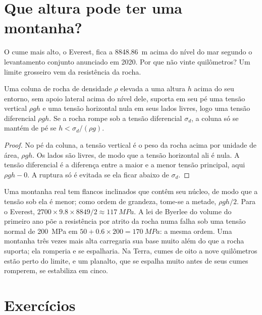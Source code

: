 \section{Que altura pode ter uma montanha?}\label{sec:b2:himalaya-andes:heights}

O cume mais alto, o Everest, fica a \qty{8848.86}{m} acima do nível do mar segundo o levantamento conjunto
anunciado em 2020. Por que não vinte quilômetros? Um limite grosseiro vem da resistência da rocha.

\begin{proposition}\label{prop:b2:himalaya-andes:height}
Uma coluna de rocha de densidade $\rho$ elevada a uma altura $h$ acima do seu entorno, sem
apoio lateral acima do nível dele, suporta em seu pé uma tensão vertical $\rho g h$ e uma
tensão horizontal nula em seus lados livres, logo uma tensão diferencial $\rho g h$. Se a
rocha rompe sob a tensão diferencial $\sigma_d$, a coluna só se mantém de pé se $h < \sigma_d/(\rho
g)$.
\end{proposition}

\begin{proof}
No pé da coluna, a tensão vertical é o peso da rocha acima por unidade de área,
$\rho g h$. Os lados são livres, de modo que a tensão horizontal ali é nula. A tensão diferencial
é a diferença entre a maior e a menor tensão principal, aqui $\rho g h - 0$.
A ruptura só é evitada se ela ficar abaixo de $\sigma_d$.
\end{proof}

Uma montanha real tem flancos inclinados que contêm seu núcleo, de modo que a tensão sob ela é
menor; como ordem de grandeza, tome-se a metade, $\rho g h/2$. Para o Everest, $2700 \times 9.8
\times 8849/2 \approx \qty{117}{MPa}$. A lei de Byerlee do volume do primeiro ano põe a resistência
por atrito da rocha numa falha sob uma tensão normal de \qty{200}{MPa} em $50 + 0.6 \times 200 =
\qty{170}{MPa}$: a mesma ordem. Uma montanha três vezes mais alta carregaria sua base muito além
do que a rocha suporta; ela romperia e se espalharia. Na Terra, cumes de oito a nove quilômetros
estão perto do limite, e um planalto, que se espalha muito antes de seus cumes romperem, se estabiliza
em cinco.

\section*{Exercícios}\label{sec:b2:himalaya-andes:exercises}

